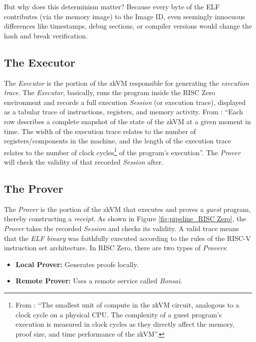 But why does this determinism matter? Because every byte of the ELF contributes (via the memory image) to the Image ID, even seemingly innocuous differences like timestamps, debug sections, or compiler versions would change the hash and break verification.

\subsection{The Executor}\makeatletter{}\makeatother
\label{executor}

The \textit{Executor} is the portion of the zkVM responsible for generating the \textit{execution trace}. The \textit{Executor}, basically, runs the program inside the RISC Zero environment and records a full execution \textit{Session} (or execution trace), displayed as a tabular trace of instructions, registers, and memory activity. From \cite{risc0_key_terminology}: “Each row describes a complete snapshot of the state of the zkVM at a given moment in time. The width of the execution trace relates to the number of registers/components in the machine, and the length of the execution trace relates to the number of clock cycles\footnote{ From \cite{risc0_key_terminology}: “The smallest unit of compute in the zkVM circuit, analogous to a clock cycle on a physical CPU. The complexity of a guest program's execution is measured in clock cycles as they directly affect the memory, proof size, and time performance of the zkVM”.} of the program's execution”. The \textit{Prover} will check the validity of that recorded \textit{Session} after.

\subsection{The Prover}\makeatletter{}\makeatother
\label{prover}

The \textit{Prover} is the portion of the zkVM that executes and proves a \textit{guest} program, thereby constructing a \textit{receipt}. As shown in Figure \ref{fig:pipeline_RISC Zero}, the \textit{Prover} takes the recorded \textit{Session} and checks its validity. A valid trace means that the \textit{ELF binary} was faithfully executed according to the rules of the RISC-V instruction set architecture. In RISC Zero, there are two types of \textit{Provers}:

\begin{itemize}
    \item \textbf{Local Prover:} Generates proofs locally.
    \item \textbf{Remote Prover:} Uses a remote service called \textit{Bonsai}\cite{risc0_remote_proving}.
\end{itemize}

